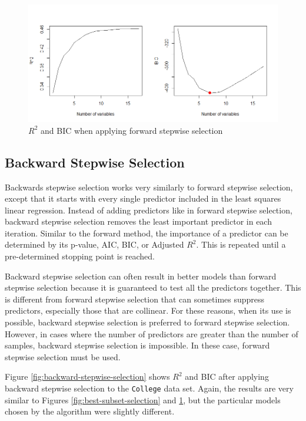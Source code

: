 \documentclass{article}
\begin{document}
\begin{figure}[!h]
	\centering
	\caption{$R^2$ and BIC when applying forward stepwise selection}
	\label{fig:forward-stepwise-selection}
	\includegraphics[width = 6in]{images/forward-stepwise-selection.png}
\end{figure}

\subsection{Backward Stepwise Selection}
Backwards stepwise selection works very similarly to forward stepwise selection, except that it starts with every single predictor included in the least squares linear regression. Instead of adding predictors like in forward stepwise selection, backward stepwise selection removes the least important predictor in each iteration. Similar to the forward method, the importance of a predictor can be determined by its p-value, AIC, BIC, or Adjusted $R^2$. This is repeated until a pre-determined stopping point is reached.

Backward stepwise selection can often result in better models than forward stepwise selection because it is guaranteed to test all the predictors together. This is different from forward stepwise selection that can sometimes suppress predictors, especially those that are collinear. For these reasons, when its use is possible, backward stepwise selection is preferred to forward stepwise selection. However, in cases where the number of predictors are greater than the number of samples, backward stepwise selection is impossible. In these case, forward stepwise selection must be used.

Figure \ref{fig:backward-stepwise-selection} shows $R^2$ and BIC after applying backward stepwise selection to the \lstinline!College! data set. Again, the results are very similar to Figures \ref{fig:best-subset-selection} and \ref{fig:forward-stepwise-selection}, but the particular models chosen by the algorithm were slightly different. 
\end{document}
